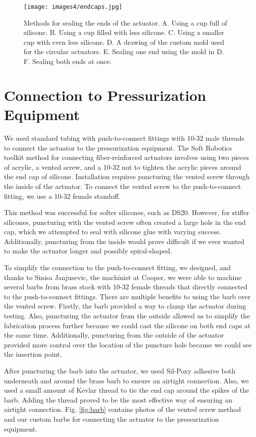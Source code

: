 \begin{figure}[ht!]
    \centering
    \texttt{[image: images4/endcaps.jpg]}
    \caption{Methods for sealing the ends of the actuator. A. Using a cup full of silicone. B. Using a cup filled with less silicone. C. Using a smaller cup with even less silicone. D. A drawing of the custom mold used for the circular actuators. E. Sealing one end using the mold in D. F. Sealing both ends at once. }
    \label{fig:endcaps}
\end{figure}

\clearpage
\section{Connection to Pressurization Equipment}
We used standard tubing with push-to-connect fittings with 10-32 male threads to connect the actuator to the pressurization equipment. The Soft Robotics toolkit method for connecting fiber-reinforced actuators involves using two pieces of acrylic, a vented screw, and a 10-32 nut to tighten the acrylic pieces around the end cap of silicone. Installation requires puncturing the vented screw through the inside of the actuator. To connect the vented screw to the push-to-connect fitting, we use a 10-32 female standoff. 

This method was successful for softer silicones, such as DS20. However, for stiffer silicones, puncturing with the vented screw often created a large hole in the end cap, which we attempted to seal with silicone glue with varying success. Additionally, puncturing from the inside would prove difficult if we ever wanted to make the actuator longer and possibly spiral-shaped. 

To simplify the connection to the push-to-connect fitting, we designed, and thanks to Sinisa Janjusevic, the machinist at Cooper, we were able to machine several barbs from brass stock with 10-32 female threads that directly connected to the push-to-connect fittings. There are multiple benefits to using the barb over the vented screw. Firstly, the barb provided a way to clamp the actuator during testing. Also, puncturing the actuator from the outside allowed us to simplify the fabrication process further because we could cast the silicone on both end caps at the same time. Additionally, puncturing from the outside of the actuator provided more control over the location of the puncture hole because we could see the insertion point. 

After puncturing the barb into the actuator, we used Sil-Poxy adhesive both underneath and around the brass barb to ensure an airtight connection. Also, we used a small amount of Kevlar thread to tie the end cap around the spikes of the barb. Adding the thread proved to be the most effective way of ensuring an airtight connection. Fig. \ref{fig:barb} contains photos of the vented screw method and our custom barbs for connecting the actuator to the pressurization equipment. 


